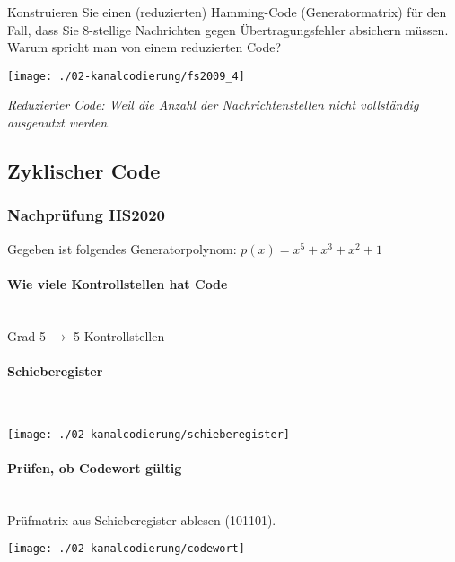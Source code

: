 Konstruieren Sie einen (reduzierten) Hamming-Code (Generatormatrix) für den Fall, dass Sie 8-stellige Nachrichten gegen Übertragungsfehler absichern müssen. Warum spricht man von einem reduzierten Code?\\
\begin{center}
    \vspace{-8pt}
    \texttt{[image: ./02-kanalcodierung/fs2009\_4]}
    \vspace{-8pt}
\end{center}
\textit{Reduzierter Code: Weil die Anzahl der Nachrichtenstellen nicht vollständig ausgenutzt werden.}

\subsection{Zyklischer Code}
\subsubsection{Nachprüfung HS2020}
Gegeben ist folgendes Generatorpolynom:
$p(x)=x^5+x^3+x^2+1$

\paragraph{Wie viele Kontrollstellen hat Code}\mbox{}\\
Grad 5 $\rightarrow$ 5 Kontrollstellen

\paragraph{Schieberegister}\mbox{}\\
\begin{center}
    \vspace{-8pt}
    \texttt{[image: ./02-kanalcodierung/schieberegister]}
    \vspace{-8pt}
\end{center}

\paragraph{Prüfen, ob Codewort gültig}\mbox{}\\
Prüfmatrix aus Schieberegister ablesen (101101).
\begin{center}
    \vspace{-8pt}
    \texttt{[image: ./02-kanalcodierung/codewort]}
    \vspace{-8pt}
\end{center}

